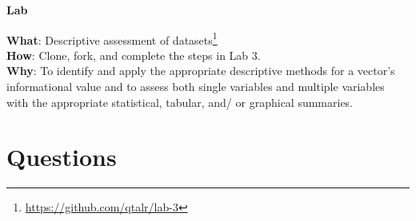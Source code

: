 \documentclass[
  letterpaper,
  DIV=11,
  numbers=noendperiod]{scrreport}
\theoremstyle{definition}
\theoremstyle{remark}
\DeclareRobustCommand{\href}[2]{#2\footnote{\url{#1}}}
\begin{document}
\begin{tcolorbox}[enhanced jigsaw, leftrule=.75mm, bottomrule=.15mm, opacityback=0, breakable, left=2mm, colback=white, toprule=.15mm, arc=.35mm, rightrule=.15mm]

\textbf{ Lab}

\textbf{What}: \href{https://github.com/qtalr/lab-3}{Descriptive
assessment of datasets}\\
\textbf{How}: Clone, fork, and complete the steps in Lab 3.\\
\textbf{Why}: To identify and apply the appropriate descriptive methods
for a vector's informational value and to assess both single variables
and multiple variables with the appropriate statistical, tabular, and/
or graphical summaries.

\end{tcolorbox}

\hypertarget{questions-2}{%
\section*{Questions}\label{questions-2}}

\end{document}
